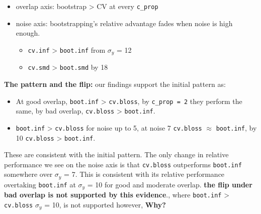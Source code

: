 \documentclass[
  letterpaper,
  DIV=11,
  numbers=noendperiod]{scrartcl}
\providecommand{\tightlist}{%
  \setlength{\itemsep}{0pt}\setlength{\parskip}{0pt}}
\begin{document}
\begin{itemize}
\tightlist
\item
  overlap axis: bootstrap \textgreater{} CV at every \texttt{c\_prop}
\item
  noise axis: bootstrapping's relative advantage fades when noise is
  high enough.

  \begin{itemize}
  \tightlist
  \item
    \texttt{cv.inf} \textgreater{} \texttt{boot.inf} from \(\sigma_y\) =
    12
  \item
    \texttt{cv.smd} \textgreater{} \texttt{boot.smd} by 18
  \end{itemize}
\end{itemize}

\textbf{The pattern and the flip:} our findings support the initial
pattern as:

\begin{itemize}
\tightlist
\item
  At good overlap, \texttt{boot.inf} \textgreater{} \texttt{cv.bloss},
  by \texttt{c\_prop\ =\ 2} they perform the same, by bad overlap,
  \texttt{cv.bloss} \textgreater{} \texttt{boot.inf}.
\item
  \texttt{boot.inf} \textgreater{} \texttt{cv.bloss} for noise up to 5,
  at noise 7 \texttt{cv.bloss} \(\approx\) \texttt{boot.inf}, by 10
  \texttt{cv.bloss} \textgreater{} \texttt{boot.inf}.
\end{itemize}

These are consistent with the initial pattern. The only change in
relative performance we see on the noise axis is that \texttt{cv.bloss}
outperforms \texttt{boot.inf} somewhere over \(\sigma_y\) = 7. This is
consistent with its relative performance overtaking \texttt{boot.inf} at
\(\sigma_y\) = 10 for good and moderate overlap. \textbf{the flip under
bad overlap is not supported by this evidence}., where \texttt{boot.inf}
\textgreater{} \texttt{cv.bloss} \(\sigma_y\) = 10, is not supported
however, \textbf{Why?}
\end{document}
